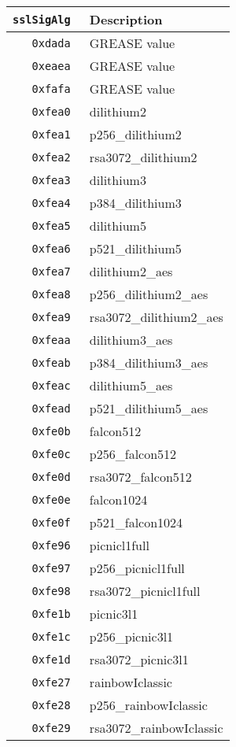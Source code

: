 \documentclass[documentation]{subfiles}
\begin{document}
\begin{minipage}{.48\textwidth}
    \begin{longtable}{>{\tt}rl}
        \toprule
        {\bf sslSigAlg} & {\bf Description}\\
        \midrule\endhead%
        0xdada & GREASE value\\
        0xeaea & GREASE value\\
        0xfafa & GREASE value\\
        0xfea0 & dilithium2\\
        0xfea1 & p256\_dilithium2\\
        0xfea2 & rsa3072\_dilithium2\\
        0xfea3 & dilithium3\\
        0xfea4 & p384\_dilithium3\\
        0xfea5 & dilithium5\\
        0xfea6 & p521\_dilithium5\\
        0xfea7 & dilithium2\_aes\\
        0xfea8 & p256\_dilithium2\_aes\\
        0xfea9 & rsa3072\_dilithium2\_aes\\
        0xfeaa & dilithium3\_aes\\
        0xfeab & p384\_dilithium3\_aes\\
        0xfeac & dilithium5\_aes\\
        0xfead & p521\_dilithium5\_aes\\
        0xfe0b & falcon512\\
        0xfe0c & p256\_falcon512\\
        0xfe0d & rsa3072\_falcon512\\
        0xfe0e & falcon1024\\
        0xfe0f & p521\_falcon1024\\
        0xfe96 & picnicl1full\\
        0xfe97 & p256\_picnicl1full\\
        0xfe98 & rsa3072\_picnicl1full\\
        0xfe1b & picnic3l1\\
        0xfe1c & p256\_picnic3l1\\
        0xfe1d & rsa3072\_picnic3l1\\
        0xfe27 & rainbowIclassic\\
        0xfe28 & p256\_rainbowIclassic\\
        0xfe29 & rsa3072\_rainbowIclassic\\

\end{longtable}
\end{minipage}
\end{document}
